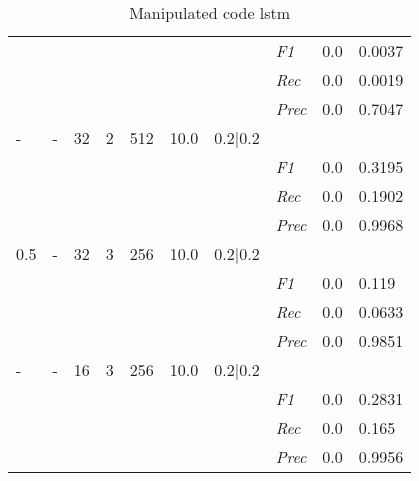 \begin{table}[]
\begin{tabularx}{\textwidth}{XXXXXXX|X|X|X}
    & & & & & & & \textit{F1} & 0.0 & 0.0037        \\
    & & & & & & & \textit{Rec} &  0.0 & 0.0019    \\
    & & & & & & & \textit{Prec} & 0.0 & 0.7047  \\ \midrule
    - & - & 32 & 2 & 512 &10.0 & 0.2|0.2 & & & \\
    & & & & & & & \textit{F1} & 0.0 & 0.3195        \\
    & & & & & & & \textit{Rec} &  0.0 & 0.1902    \\
    & & & & & & & \textit{Prec} & 0.0 & 0.9968  \\ \midrule
    0.5 & - & 32 & 3 & 256 &10.0 & 0.2|0.2 & & & \\
    & & & & & & & \textit{F1} & 0.0 & 0.119        \\
    & & & & & & & \textit{Rec} &  0.0 & 0.0633    \\
    & & & & & & & \textit{Prec} & 0.0 & 0.9851  \\ \midrule
    - & - & 16 & 3 & 256 &10.0 & 0.2|0.2 & & & \\
    & & & & & & & \textit{F1} & 0.0 & 0.2831        \\
    & & & & & & & \textit{Rec} &  0.0 & 0.165    \\
    & & & & & & & \textit{Prec} & 0.0 & 0.9956  \\ \midrule
    \end{tabularx}
    \caption{Manipulated code lstm}
    \label{tab:rq3_lstm}
    \end{table}